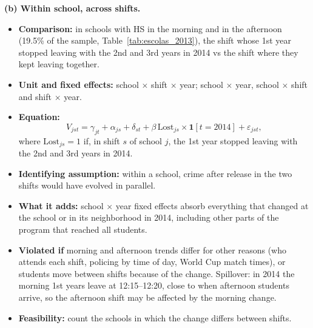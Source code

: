 \documentclass[11pt]{article}
\begin{document}
\medskip
\noindent\textbf{(b) Within school, across shifts.}
\begin{itemize}
  \item \textbf{Comparison:} in schools with HS in the morning and in the
        afternoon (19.5\% of the sample, Table~\ref{tab:escolas_2013}), the
        shift whose 1st year stopped leaving with the 2nd and 3rd years in 2014
        vs the shift where they kept leaving together.
  \item \textbf{Unit and fixed effects:} school $\times$ shift $\times$ year;
        school $\times$ year, school $\times$ shift and shift $\times$ year.
  \item \textbf{Equation:}
        \begin{equation}
          V_{jst} = \gamma_{jt} + \alpha_{js} + \delta_{st} + \beta\,
          \text{Lost}_{js} \times \mathbf{1}[t=2014] + \varepsilon_{jst},
        \end{equation}
        where $\text{Lost}_{js}=1$ if, in shift $s$ of school $j$, the 1st year
        stopped leaving with the 2nd and 3rd years in 2014.
  \item \textbf{Identifying assumption:} within a school, crime after release
        in the two shifts would have evolved in parallel.
  \item \textbf{What it adds:} school $\times$ year fixed effects absorb
        everything that changed at the school or in its neighborhood in 2014,
        including other parts of the program that reached all students.
  \item \textbf{Violated if} morning and afternoon trends differ for other
        reasons (who attends each shift, policing by time of day, World Cup
        match times), or students move between shifts because of the change.
        Spillover: in 2014 the morning 1st years leave at 12:15--12:20, close
        to when afternoon students arrive, so the afternoon shift may be
        affected by the morning change.
  \item \textbf{Feasibility:} count the schools in which the change differs
        between shifts.
\end{itemize}
\end{document}

